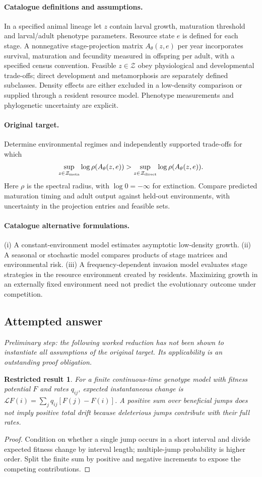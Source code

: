 \documentclass[11pt]{article}
\newtheorem{attemptresult}{Restricted result}[section]
\begin{document}
\paragraph{Catalogue definitions and assumptions.}
In a specified animal lineage let $z$ contain larval growth, maturation threshold and larval/adult phenotype parameters. Resource state $e$ is defined for each stage. A nonnegative stage-projection matrix $A_\theta(z,e)$ per year incorporates survival, maturation and fecundity measured in offspring per adult, with a specified census convention. Feasible $z\in\mathcal Z$ obey physiological and developmental trade-offs; direct development and metamorphosis are separately defined subclasses. Density effects are either excluded in a low-density comparison or supplied through a resident resource model. Phenotype measurements and phylogenetic uncertainty are explicit.
\paragraph{Original target.}
Determine environmental regimes and independently supported trade-offs for which
    \[\sup_{z\in\mathcal Z_{\rm meta}}\log\rho(A_\theta(z,e))>
      \sup_{z\in\mathcal Z_{\rm direct}}\log\rho(A_\theta(z,e)).\]
    Here $\rho$ is the spectral radius, with $\log0=-\infty$ for extinction. Compare predicted maturation timing and adult output against held-out environments, with uncertainty in the projection entries and feasible sets.
\paragraph{Catalogue alternative formulations.}
(i) A constant-environment model estimates asymptotic low-density growth. (ii) A seasonal or stochastic model compares products of stage matrices and environmental risk. (iii) A frequency-dependent invasion model evaluates stage strategies in the resource environment created by residents. Maximizing growth in an externally fixed environment need not predict the evolutionary outcome under competition.
\subsection{Attempted answer}
\noindent\emph{Preliminary step: the following worked reduction has not been shown to instantiate all assumptions of the original target. Its applicability is an outstanding proof obligation.}

\begin{attemptresult}
For a finite continuous-time genotype model with fitness potential $F$ and rates $q_{ij}$, expected instantaneous change is $\mathcal LF(i)=\sum_jq_{ij}[F(j)-F(i)]$. A positive sum over beneficial jumps does not imply positive total drift because deleterious jumps contribute with their full rates.
\end{attemptresult}
\begin{proof}
Condition on whether a single jump occurs in a short interval and divide expected fitness change by interval length; multiple-jump probability is higher order. Split the finite sum by positive and negative increments to expose the competing contributions.
\end{proof}
\end{document}
